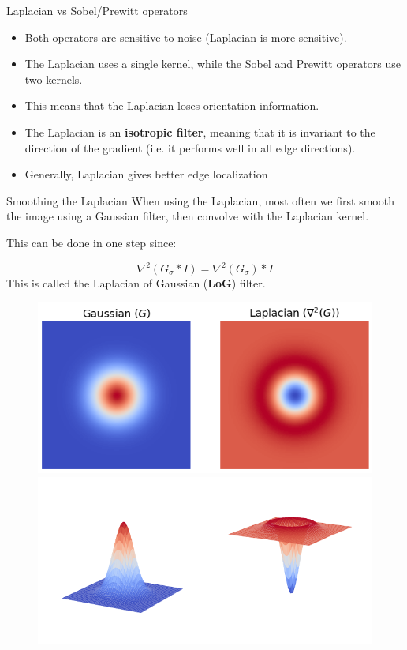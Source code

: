 \documentclass[9pt, aspectratio=169]{beamer}
\begin{document}
\begin{frame}
    {Laplacian vs Sobel/Prewitt operators}
    \begin{itemize}
        \item Both operators are sensitive to noise (Laplacian is more sensitive).
        \item The Laplacian uses a single kernel, while the Sobel and Prewitt operators use two kernels.
        \item This means that the Laplacian loses orientation information.
        \item The Laplacian is an \textbf{isotropic filter}, meaning that it is invariant to the direction of the gradient (i.e. it performs well in all edge directions).
        \item Generally, Laplacian gives better edge localization
    \end{itemize}

\end{frame}
\begin{frame}
    {Smoothing the Laplacian}
    When using the Laplacian, most often we first smooth the image using a Gaussian filter, then convolve with the Laplacian kernel.

    This can be done in one step since:

    \Large
    $$\nabla^2(G_\sigma * I) = \nabla^2(G_\sigma) * I$$
    \pause
    \normalsize
    This is called the Laplacian of Gaussian (\textbf{LoG}) filter.

    \begin{figure}
        \centering
        \includegraphics[width=.45\textwidth]{gaussian_and_laplacian_2D.png}
        \includegraphics[width=.45\textwidth]{gaussian_and_laplacian_3D.png}
    \end{figure}
\end{frame}
\end{document}

